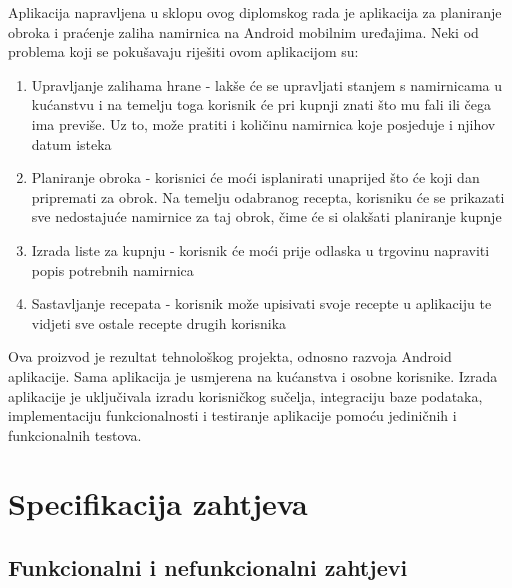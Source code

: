 \documentclass[diplomskirad]{fer}
\begin{document}
Aplikacija napravljena u sklopu ovog diplomskog rada je aplikacija za planiranje obroka i praćenje zaliha namirnica na Android mobilnim uređajima. Neki od problema koji se pokušavaju riješiti ovom aplikacijom su:
\begin{enumerate}
    \item Upravljanje zalihama hrane - lakše će se upravljati stanjem s namirnicama u kućanstvu i na temelju toga korisnik će pri kupnji znati što mu fali ili čega ima previše. Uz to, može pratiti i količinu namirnica koje posjeduje i njihov datum isteka
    \item Planiranje obroka - korisnici će moći isplanirati unaprijed što će koji dan pripremati za obrok. Na temelju odabranog recepta, korisniku će se prikazati sve nedostajuće namirnice za taj obrok, čime će si olakšati planiranje kupnje
    \item Izrada liste za kupnju - korisnik će moći prije odlaska u trgovinu napraviti popis potrebnih namirnica
    \item Sastavljanje recepata - korisnik može upisivati svoje recepte u aplikaciju te vidjeti sve ostale recepte drugih korisnika
\end{enumerate}

Ova proizvod je rezultat tehnološkog projekta, odnosno razvoja Android aplikacije. Sama aplikacija je usmjerena na kućanstva i osobne korisnike. Izrada aplikacije je uključivala izradu korisničkog sučelja, integraciju baze podataka, implementaciju funkcionalnosti i testiranje aplikacije pomoću jediničnih i funkcionalnih testova. 

\chapter{Specifikacija zahtjeva}
\section{Funkcionalni i nefunkcionalni zahtjevi}
\end{document}

